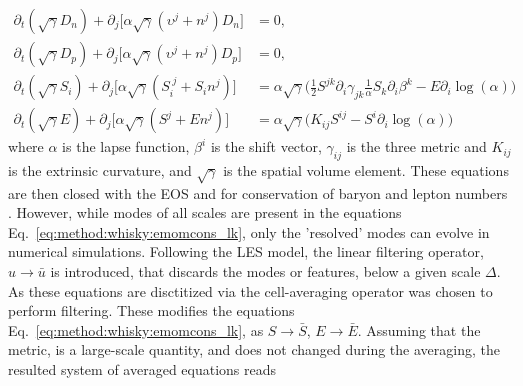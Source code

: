 \begin{equation}
\begin{aligned}
\label{eq:method:whisky:emomcons_lk}
\partial_t(\sqrt{\gamma}D_n) + \partial_j\Big[ \alpha\sqrt{\gamma}(\upsilon^j + n^j)D_n \Big] &= 0, \\
\partial_t(\sqrt{\gamma}D_p) + \partial_j\Big[ \alpha\sqrt{\gamma}(\upsilon^j + n^j)D_p \Big] &= 0, \\
\partial_t(\sqrt{\gamma}S_i) + \partial_j\Big[ \alpha \sqrt{\gamma} (S_i^{\; j} + S_i n^j) \Big] &= 
\alpha \sqrt{\gamma}\Big( \frac{1}{2} S^{jk} \partial_i \gamma_{jk} \frac{1}{\alpha} S_k \partial_i \beta^k - E\partial_i \log(\alpha) \Big) \\
\partial_t(\sqrt{\gamma}E) + \partial_j\Big[ \alpha \sqrt{\gamma} (S^{j} + E n^j) \Big] &= 
\alpha \sqrt{\gamma}\Big( K_{ij}S^{ij} - S^i\partial_i \log(\alpha) \Big) 
\end{aligned}
\end{equation}
%
where $\alpha$ is the lapse function, $\beta^i$ is the shift vector, 
$\gamma_{ij}$ is the three metric and $K_{ij}$ is the extrinsic curvature, 
and $\sqrt{\gamma}$ is the spatial volume element.
%
These equations are then closed with the EOS and  for conservation of baryon and 
lepton numbers .
%
However, while modes of all scales are present in the equations Eq.~\eqref{eq:method:whisky:emomcons_lk}, 
only the 'resolved' modes can evolve in numerical simulations. 
%
Following the \ac{LES} model, the linear filtering operator, $u\rightarrow \bar{u}$ is introduced, that 
discards the modes or features, below a given scale $\Delta$.
As these equations are disctitized via  the cell-averaging operator was chosen to
perform filtering. These modifies the equations Eq.~\eqref{eq:method:whisky:emomcons_lk}, as
$S\rightarrow\bar{S}$, $E\rightarrow\bar{E}$.
%
Assuming that the metric, is a large-scale quantity, and does not changed during the averaging, 
the resulted system of averaged equations reads \citep{Radice:2017zta}

